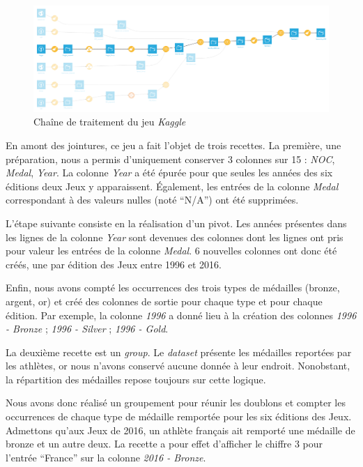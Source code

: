 \documentclass[hidelinks, 12pt]{report}
\begin{document}
\begin{center}
	\begin{figure}[H]
		\setlength{\belowcaptionskip}{-35pt}
		\includegraphics[scale=0.35]{images/flow-medals-kaggle.png}
		\caption{Chaîne de traitement du jeu \textit{Kaggle}}
	\end{figure}
\end{center}

En amont des jointures, ce jeu a fait l'objet de trois recettes. La première, une préparation, nous a permis d'uniquement conserver 3 colonnes sur 15 : \textit{NOC}, \textit{Medal}, \textit{Year}. La colonne \textit{Year} a été épurée pour que seules les années des six éditions deux Jeux y apparaissent. Également, les entrées de la colonne \textit{Medal} correspondant à des valeurs nulles (noté \enquote{N/A}) ont été supprimées.

L'étape suivante consiste en la réalisation d'un pivot. Les années présentes dans les lignes de la colonne \textit{Year} sont devenues des colonnes dont les lignes ont pris pour valeur les entrées de la colonne \textit{Medal}. 6 nouvelles colonnes ont donc été créés, une par édition des Jeux entre 1996 et 2016.

Enfin, nous avons compté les occurrences des trois types de médailles (bronze, argent, or) et créé des colonnes de sortie pour chaque type et pour chaque édition. Par exemple, la colonne \emph{1996} a donné lieu à la création des colonnes \emph{1996 - Bronze} ; \emph{1996 - Silver} ; \emph{1996 - Gold}.

La deuxième recette est un \emph{group}. Le \emph{dataset} présente les médailles reportées par les athlètes, or nous n'avons conservé aucune donnée à leur endroit. Nonobstant, la répartition des médailles repose toujours sur cette logique.

Nous avons donc réalisé un groupement pour réunir les doublons et compter les occurrences de chaque type de médaille remportée pour les six éditions des Jeux. Admettons qu'aux Jeux de 2016, un athlète français ait remporté une médaille de bronze et un autre deux. La recette a pour effet d'afficher le chiffre 3 pour l'entrée \enquote{France} sur la colonne \emph{2016 - Bronze}.
\end{document}
